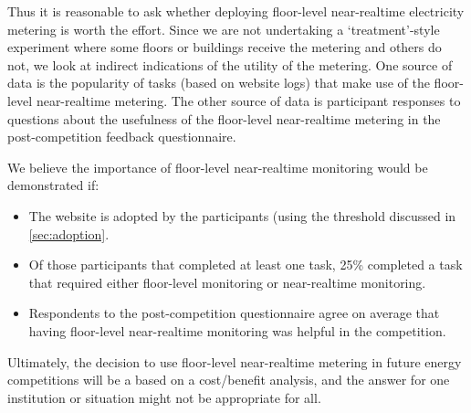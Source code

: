 Thus it is reasonable to ask whether deploying floor-level near-realtime electricity metering is worth the effort. Since we are not undertaking a `treatment'-style experiment where some floors or buildings receive the metering and others do not, we look at indirect indications of the utility of the metering. One source of data is the popularity of tasks (based on website logs) that make use of the floor-level near-realtime metering. The other source of data is participant responses to questions about the usefulness of the floor-level near-realtime metering in the post-competition feedback questionnaire.

We believe the importance of floor-level near-realtime monitoring would be demonstrated if:

\begin{itemize}
	\item The website is adopted by the participants (using the threshold discussed in \autoref{sec:adoption}.
	\item Of those participants that completed at least one task, 25\% completed a task that required either floor-level monitoring or near-realtime monitoring.
	\item Respondents to the post-competition questionnaire agree on average that having floor-level near-realtime monitoring was helpful in the competition.
\end{itemize}

Ultimately, the decision to use floor-level near-realtime metering in future energy competitions will be a based on a cost/benefit analysis, and the answer for one institution or situation might not be appropriate for all.